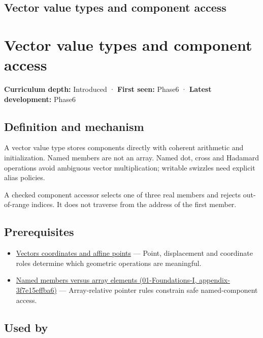 \hypertarget{appendix-37a39984ba66}{}
\section*{Vector value types and component access}
\chapter{Vector value types and component access}\label{appendix-37a39984ba66-vector-value-types-and-component-access}

\textbf{Curriculum depth:} Introduced · \textbf{First seen:} Phase6 · \textbf{Latest development:} Phase6

\section{Definition and mechanism}\label{appendix-37a39984ba66-definition-and-mechanism}

A vector value type stores components directly with coherent arithmetic and initialization. Named members are not an array. Named dot, cross and Hadamard operations avoid ambiguous vector multiplication; writable swizzles need explicit alias policies.

A checked component accessor selects one of three real members and rejects out-of-range indices. It does not traverse from the address of the first member.

\section{Prerequisites}\label{appendix-37a39984ba66-prerequisites}

\begin{itemize}
\tightlist
\item
  \hyperref[appendix-0659864c0aa3]{Vectors coordinates and affine points} --- Point, displacement and coordinate roles determine which geometric operations are meaningful.
\item
  \href{../01-Foundations-I/main.pdf\#nameddest=appendix-3f7e15effba6}{Named members versus array elements (01-Foundations-I, appendix-3f7e15effba6)} --- Array-relative pointer rules constrain safe named-component access.
\end{itemize}

\section{Used by}\label{appendix-37a39984ba66-used-by}

